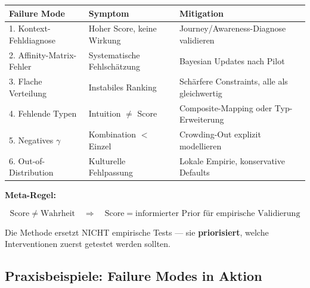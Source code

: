 \begin{tcolorbox}[colback=orange!5!white, colframe=orange!75!black,
    title=\textbf{Zusammenfassung: Wann NICHT anwenden?}]

\renewcommand{\arraystretch}{1.3}
\begin{tabular}{@{}p{4cm}p{3cm}p{5cm}@{}}
\toprule
\textbf{Failure Mode} & \textbf{Symptom} & \textbf{Mitigation} \\
\midrule
1. Kontext-Fehldiagnose & Hoher Score, keine Wirkung & Journey/Awareness-Diagnose validieren \\
2. Affinity-Matrix-Fehler & Systematische Fehlschätzung & Bayesian Updates nach Pilot \\
3. Flache Verteilung & Instabiles Ranking & Schärfere Constraints, alle als gleichwertig \\
4. Fehlende Typen & Intuition $\neq$ Score & Composite-Mapping oder Typ-Erweiterung \\
5. Negatives $\gamma$ & Kombination $<$ Einzel & Crowding-Out explizit modellieren \\
6. Out-of-Distribution & Kulturelle Fehlpassung & Lokale Empirie, konservative Defaults \\
\bottomrule
\end{tabular}

\medskip
\textbf{Meta-Regel:}

\begin{equation*}
\boxed{\text{Score} \neq \text{Wahrheit} \quad \Rightarrow \quad \text{Score} = \text{informierter Prior für empirische Validierung}}
\end{equation*}

Die Methode ersetzt NICHT empirische Tests --- sie \textbf{priorisiert}, welche Interventionen zuerst getestet werden sollten.

\end{tcolorbox}

\subsection{Praxisbeispiele: Failure Modes in Aktion}
\label{sec:hhh-failure-examples}

